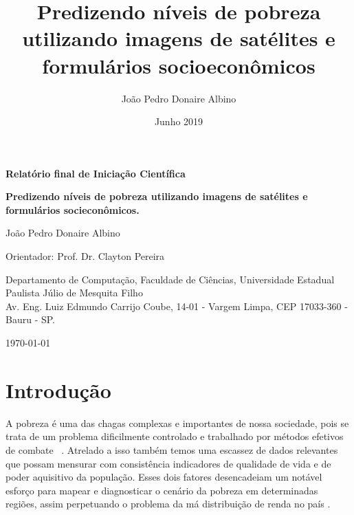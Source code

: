 \documentclass[]{article}
\title{Predizendo ní­veis de pobreza utilizando imagens de satélites e formulários socioeconômicos}
\author{João Pedro Donaire Albino }
\date{Junho 2019}
\begin{document}
\begin{center}
	\renewcommand{\baselinestretch}{1}
\end{center}

\vspace*{1cm}

\begin{center}
	\textbf{Relatório final de Iniciação Científica}
	
	\vspace*{1cm}
	
	\renewcommand{\baselinestretch}{2}
	\bf {\huge \sc Predizendo níveis de pobreza utilizando imagens de satélites e formulários socieconômicos.}
	\renewcommand{\baselinestretch}{1}
	
\end{center}

\vspace*{2.0cm}

\begin{center}
	
	\large João Pedro Donaire Albino
	
	\vspace*{1.0cm}
	
	\large Orientador:
	\large Prof. Dr. Clayton Pereira
	
	\vspace*{0.5cm}
	
	Departamento de Computação, Faculdade de Ciências, Universidade Estadual Paulista Júlio de Mesquita Filho\\
	Av. Eng. Luiz Edmundo Carrijo Coube, 14-01 - Vargem Limpa, CEP 17033-360 - Bauru - SP.
	
\end{center}

\vspace*{2.0cm}

\centerline{\large \today}

\newpage

\section{Introdução}
\label{s.introducao}

A pobreza é uma das chagas complexas e importantes de nossa sociedade, pois se trata de um problema dificilmente controlado e trabalhado por métodos efetivos de combate ~\cite{ref_pobreza1}. Atrelado a isso também temos uma escassez de dados relevantes que possam mensurar com consistência indicadores de qualidade de vida e de poder aquisitivo da população. Esses dois fatores desencadeiam um notável esforço para mapear e diagnosticar o cenário da pobreza em determinadas regiões, assim perpetuando o problema da má distribuição de renda no país \cite{ref_ma_distribuicao}.
\end{document}
